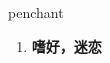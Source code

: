 
\begin{frame}
{\huge penchant}
\begin{center}
\begin{enumerate}\Large
  \item \textbf{嗜好，迷恋}
\end{enumerate}
\end{center}
\end{frame}

